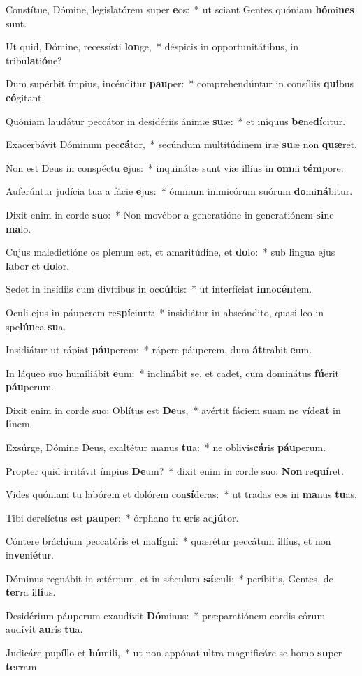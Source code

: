 \item Constítue, Dómine, legislatórem super \textbf{e}os:~* ut sciant Gentes quóniam \textbf{hó}mi\textbf{nes} sunt.
\item Ut quid, Dómine, recessísti \textbf{lon}ge,~* déspicis in opportunitátibus, in tribu\textbf{la}ti\textbf{ó}ne?
\item Dum supérbit ímpius, incénditur \textbf{pau}per:~* comprehendúntur in consíliis \textbf{qui}bus \textbf{có}gitant.
\item Quóniam laudátur peccátor in desidériis ánimæ \textbf{su}æ:~* et iníquus \textbf{be}ne\textbf{dí}citur.
\item Exacerbávit Dóminum pec\textbf{cá}tor,~* secúndum multitúdinem iræ \textbf{su}æ non \textbf{quæ}ret.
\item Non est Deus in conspéctu \textbf{e}jus:~* inquinátæ sunt viæ illíus in \textbf{om}ni \textbf{tém}pore.
\item Auferúntur judícia tua a fácie \textbf{e}jus:~* ómnium inimicórum suórum \textbf{do}mi\textbf{ná}bitur.
\item Dixit enim in corde \textbf{su}o:~* Non movébor a generatióne in generatiónem \textbf{si}ne \textbf{ma}lo.
\item Cujus maledictióne os plenum est, et amaritúdine, et \textbf{do}lo:~* sub lingua ejus \textbf{la}bor et \textbf{do}lor.
\item Sedet in insídiis cum divítibus in oc\textbf{cúl}tis:~* ut interfíciat \textbf{in}no\textbf{cén}tem.
\item Oculi ejus in páuperem re\textbf{spí}ciunt:~* insidiátur in abscóndito, quasi leo in spe\textbf{lún}ca \textbf{su}a.
\item Insidiátur ut rápiat \textbf{páu}perem:~* rápere páuperem, dum \textbf{át}trahit \textbf{e}um.
\item In láqueo suo humiliábit \textbf{e}um:~* inclinábit se, et cadet, cum dominátus \textbf{fú}erit \textbf{páu}perum.
\item Dixit enim in corde suo: Oblítus est \textbf{De}us,~* avértit fáciem suam ne víde\textbf{at} in \textbf{fi}nem.
\item Exsúrge, Dómine Deus, exaltétur manus \textbf{tu}a:~* ne oblivis\textbf{cá}ris \textbf{páu}perum.
\item Propter quid irritávit ímpius \textbf{De}um?~* dixit enim in corde suo: \textbf{Non} re\textbf{quí}ret.
\item Vides quóniam tu labórem et dolórem con\textbf{sí}deras:~* ut tradas eos in \textbf{ma}nus \textbf{tu}as.
\item Tibi derelíctus est \textbf{pau}per:~* órphano tu \textbf{e}ris ad\textbf{jú}tor.
\item Cóntere bráchium peccatóris et ma\textbf{lí}gni:~* quærétur peccátum illíus, et non in\textbf{ve}ni\textbf{é}tur.
\item Dóminus regnábit in ætérnum, et in sǽculum \textbf{sǽ}culi:~* períbitis, Gentes, de \textbf{ter}ra il\textbf{lí}us.
\item Desidérium páuperum exaudívit \textbf{Dó}minus:~* præparatiónem cordis eórum audívit \textbf{au}ris \textbf{tu}a.
\item Judicáre pupíllo et \textbf{hú}mili,~* ut non appónat ultra magnificáre se homo \textbf{su}per \textbf{ter}ram.
